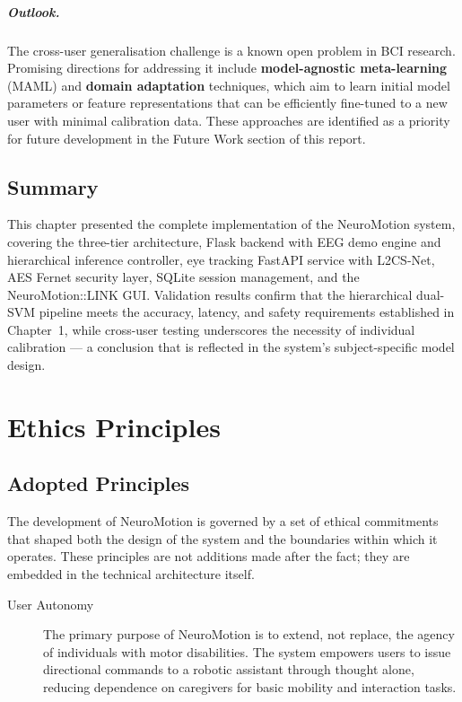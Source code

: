 \documentclass[12pt, a4paper, oneside]{report}
\begin{document}
\begin{description}
\paragraph{Outlook.}
The cross-user generalisation challenge is a known open problem in BCI research.
Promising directions for addressing it include \textbf{model-agnostic
meta-learning} (MAML) and \textbf{domain adaptation} techniques, which aim to
learn initial model parameters or feature representations that can be efficiently
fine-tuned to a new user with minimal calibration data. These approaches are
identified as a priority for future development in the Future Work section of this
report.

\section{Summary}

This chapter presented the complete implementation of the NeuroMotion system,
covering the three-tier architecture, Flask backend with EEG demo engine and
hierarchical inference controller, eye tracking FastAPI service with L2CS-Net,
AES Fernet security layer, SQLite session management, and the NeuroMotion::LINK
GUI. Validation results confirm that the hierarchical dual-SVM pipeline meets the
accuracy, latency, and safety requirements established in Chapter~1, while
cross-user testing underscores the necessity of individual calibration --- a
conclusion that is reflected in the system's subject-specific model design.

\chapter{Ethics Principles}

\section{Adopted Principles}

The development of NeuroMotion is governed by a set of ethical commitments that
shaped both the design of the system and the boundaries within which it operates.
These principles are not additions made after the fact; they are embedded in the
technical architecture itself.

\begin{description}
    \item[User Autonomy]
    The primary purpose of NeuroMotion is to extend, not replace, the agency of
    individuals with motor disabilities. The system empowers users to issue directional
    commands to a robotic assistant through thought alone, reducing dependence on
    caregivers for basic mobility and interaction tasks.


\end{description}
\end{description}
\end{document}
